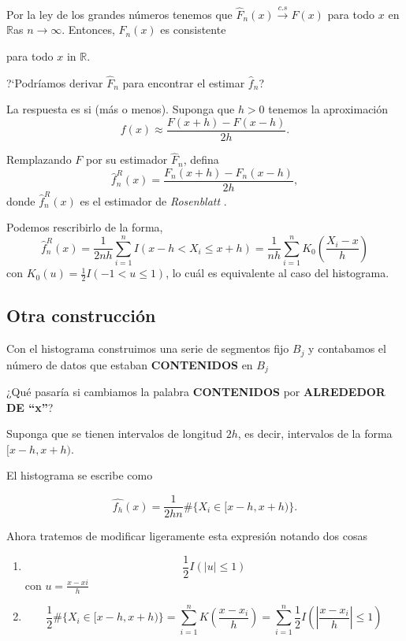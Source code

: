 \documentclass[12pt]{book}\usepackage[]{graphicx}\usepackage[]{color}
\theoremstyle{definition}
\theoremstyle{plain}
\begin{document}
Por la ley de los grandes números tenemos que \(\hat{F}_{n}(x)
\xrightarrow{c.s} F(x)\) para todo  $x$ en $\mathbb{R}$as
$n\rightarrow\infty$. Entonces, $F_{n}(x)$ es consistente

para todo $x$ in $\mathbb{R}$.

\begin{pregunta}{}{}
	?`Podríamos derivar \(\hat{F}_n\) para encontrar el estimar \(\hat{f}_n\)?
\end{pregunta}

La respuesta es si (más o menos).
\newpage
Suponga que $h>0$ tenemos la aproximación
\[
	f(x)\approx\frac{F(x+h)-F(x-h)}{2h}.
\]

Remplazando $F$  por su estimador  $\hat{F}_{n}$, defina
\[
	\hat{f}_{n}^{R}(x)=\frac{F_{n}(x+h)-F_{n}(x-h)}{2h},
\]
donde $\hat{f}_{n}^{R}(x)$ es el estimador de \emph{Rosenblatt }.

Podemos rescribirlo de la forma,
\[
	\hat{f}_{n}^{R}(x)=\frac{1}{2nh}\sum_{i=1}^{n}I(x-h<X_{i}\leq x+h)=\frac{1}{nh}\sum_{i=1}^{n}K_{0}\left(\frac{X_{i}-x}{h}\right)
\]
con  $K_{0}(u)=\frac{1}{2}I(-1<u\leq1)$, lo cuál es equivalente al caso del histograma.

\newpage

\subsection{Otra construcción}

Con el histograma construimos una serie de segmentos fijo \(B_{j}\) y contabamos el número de datos que estaban \textbf{CONTENIDOS} en \(B_{j}\)

\begin{pregunta}{}{}
	¿Qué pasaría si cambiamos la palabra \textbf{CONTENIDOS} por \textbf{ALREDEDOR DE ``x''}?
\end{pregunta}

Suponga que se tienen intervalos de longitud $ 2h $, es decir, intervalos de la forma $ [x-h,x+h) $.

El histograma  se escribe como

\begin{equation*}
	\hat{f_{h}}(x) = \dfrac{1}{2hn} \# \{ X_i \in [x-h,x+h) \}.
\end{equation*}

Ahora tratemos de modificar ligeramente esta expresión notando dos cosas

\begin{enumerate}
	\item \begin{equation*}
		      \frac{1}{2} I \left( \left\vert u \right\vert \leq 1 \right)
	      \end{equation*}
	      con \(u = \frac{x-xi}{h}\)
	\item

	      \begin{equation*}
		      \frac{1}{2}\# \{ X_i \in [x-h,x+h) \}
		      =\sum_{i=1}^{n} K\left( \frac{x-x_{i}}{h} \right)
		      =\sum_{i=1}^{n}  \frac{1}{2} I \left( \left\vert \frac{x-x_{i}}{h}
		      \right\vert \leq 1 \right)
	      \end{equation*}
\end{enumerate}
\end{document}
